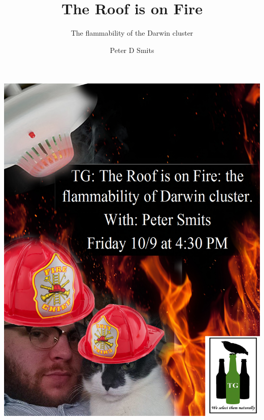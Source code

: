 \documentclass{beamer}
\title{The Roof is on Fire}
\subtitle{The flammability of the Darwin cluster}
\author{Peter D Smits}
\institute{Committee on Evolutionary Biology, University of Chicago}
\date{}
\begin{document}
\begin{frame}
  \maketitle
\end{frame}

\begin{frame}
  \begin{center}
    \includegraphics[width=\textwidth,height=0.8\textheight,keepaspectratio=true]{TGposter1}
  \end{center}
\end{frame}
\end{document}
